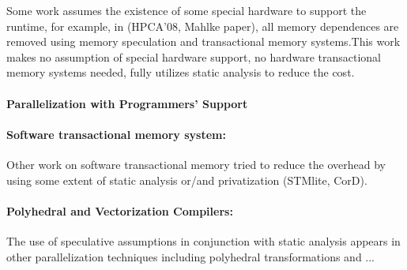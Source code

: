 Some work assumes the existence of some special hardware to support the runtime,
for example, in (HPCA’08, Mahlke paper), all memory dependences are removed
using memory speculation and transactional memory systems.This work makes no
assumption of special hardware support, no hardware transactional memory systems
needed, fully utilizes static analysis to reduce the cost.

\paragraph{Parallelization with Programmers' Support}

\paragraph{Software transactional memory system:}

Other work on software transactional memory tried to reduce the overhead by
using some extent of static analysis or/and privatization (STMlite, CorD).

\paragraph{Polyhedral and Vectorization Compilers:}

The use of speculative assumptions in conjunction with static analysis appears
in other parallelization techniques including polyhedral transformations and ...